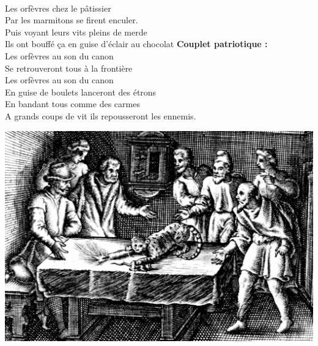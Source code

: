 \\Les orfèvres chez le pâtissier
\\Par les marmitons se firent enculer.
\\Puis voyant leurs vits pleins de merde
\\Ils ont bouffé ça en guise d'éclair au chocolat
\breakpage
\textbf{Couplet patriotique :}
\\Les orfèvres au son du canon
\\Se retrouveront tous à la frontière
\\Les orfèvres au son du canon
\\En guise de boulets lanceront des étrons
\\En bandant tous comme des carmes
\\A grands coups de vit ils repousseront les ennemis.
\\
\bigskip
\begin{center}
\centering
    \includegraphics[width=1\textwidth]{images/brev6.png}
 \end{center}

\breakpage